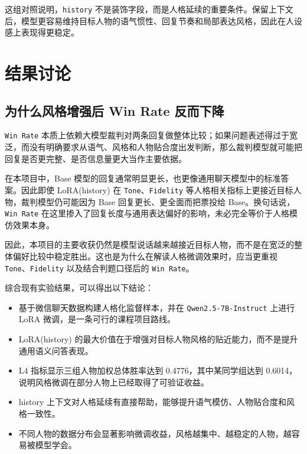 \documentclass[12pt,a4paper]{ctexart}
\begin{document}
这组对照说明，\texttt{history} 不是装饰字段，而是人格延续的重要条件。保留上下文后，模型更容易维持目标人物的语气惯性、回复节奏和局部表达风格，因此在人设感上表现得更稳定。

\section{结果讨论}

\subsection{为什么风格增强后 Win Rate 反而下降}

\texttt{Win Rate} 本质上依赖大模型裁判对两条回复做整体比较；如果问题表述得过于宽泛，而没有明确要求从语气、风格和人物贴合度出发判断，那么裁判模型就可能把回复是否更完整、是否信息量更大当作主要依据。

在本项目中，Base 模型的回复通常明显更长，也更像通用聊天模型中的标准答案。因此即使 LoRA(history) 在 \texttt{Tone}、\texttt{Fidelity} 等人格相关指标上更接近目标人物，裁判模型仍可能因为 Base 回复更长、更全面而把票投给 Base。换句话说，\texttt{Win Rate} 在这里掺入了回复长度与通用表达偏好的影响，未必完全等价于人格模仿效果本身。

因此，本项目的主要收获仍然是模型说话越来越接近目标人物，而不是在宽泛的整体偏好比较中稳定胜出。这也是为什么在解读人格微调效果时，应当更重视 \texttt{Tone}、\texttt{Fidelity} 以及结合判题口径后的 \texttt{Win Rate}。



综合现有实验结果，可以得出以下结论：

\begin{itemize}
  \item 基于微信聊天数据构建人格化监督样本，并在 \texttt{Qwen2.5-7B-Instruct} 上进行 LoRA 微调，是一条可行的课程项目路线。
  \item LoRA(history) 的最大价值在于增强对目标人物风格的贴近能力，而不是提升通用语义问答表现。
  \item L4 指标显示三组人物加权总体胜率达到 0.4776，其中某同学组达到 0.6014，说明风格微调在部分人物上已经取得了可验证收益。
  \item history 上下文对人格延续有直接帮助，能够提升语气模仿、人物贴合度和风格一致性。
  \item 不同人物的数据分布会显著影响微调收益，风格越集中、越稳定的人物，越容易被模型学会。
\end{itemize}
\end{document}
